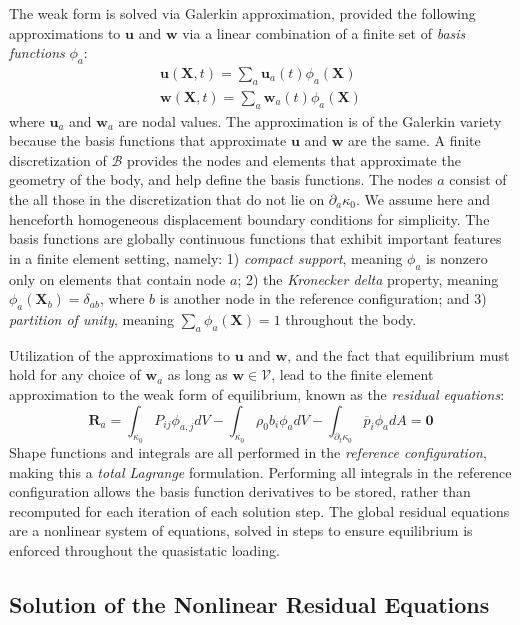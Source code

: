 The weak form is solved via Galerkin approximation, provided the following approximations to $\bm{u}$ and $\bm{w}$ via a linear combination of a finite set of \textit{basis functions} $\phi_a$:
\begin{gather}
\bm{u}(\bm{X},t) = \sum\limits_{a}\bm{u}_a(t)\phi_a(\bm{X}) \\
\bm{w}(\bm{X},t) = \sum\limits_{a}\bm{w}_a(t)\phi_a(\bm{X})
\end{gather}
where $\bm{u}_a$ and $\bm{w}_a$ are nodal values. The approximation is of the Galerkin variety because the basis functions that approximate $\bm{u}$ and $\bm{w}$ are the same. A finite discretization of $\mathcal{B}$ provides the nodes and elements that approximate the geometry of the body, and help define the basis functions. The nodes $a$ consist of the all those in the discretization that do not lie on $\partial_a\kappa_0$. We assume here and henceforth homogeneous displacement boundary conditions for simplicity. The basis functions are globally continuous functions that exhibit important features in a finite element setting, namely: 1) \textit{compact support}, meaning $\phi_a$ is nonzero only on elements that contain node $a$; 2) the \textit{Kronecker delta} property, meaning $\phi_a(\bm{X}_b) = \delta_{ab}$, where $b$ is another node in the reference configuration; and 3) \textit{partition of unity}, meaning $\sum\limits_a\phi_a(\bm{X}) = 1$ throughout the body.

Utilization of the approximations to $\bm{u}$ and $\bm{w}$, and the fact that equilibrium must hold for any choice of $\bm{w}_a$ as long as $\bm{w} \in \mathcal{V}$, lead to the finite element approximation to the weak form of equilibrium, known as the \textit{residual equations}:
\begin{equation}
\bm{R}_a = \int_{\kappa_0}P_{ij}\phi_{a,j}dV - \int_{\kappa_0}\rho_0b_i\phi_adV - \int_{\partial_t\kappa_0} \overline{p}_i\phi_adA = \bm{0}
\label{eqn:elresid}
\end{equation}
Shape functions and integrals are all performed in the \textit{reference configuration}, making this a \textit{total Lagrange} formulation. Performing all integrals in the reference configuration allows the basis function derivatives to be stored, rather than recomputed for each iteration of each solution step. The global residual equations are a nonlinear system of equations, solved in steps to ensure equilibrium is enforced throughout the quasistatic loading.

\subsection{Solution of the Nonlinear Residual Equations}

